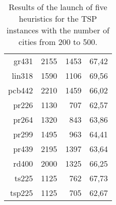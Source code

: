 \begin{table}[!htbp]
\begin{tabular}{||r|r|r|r||}
		gr431         & 2155                              & 1453                             & 67,42                                                \\
		lin318        & 1590                              & 1106                             & 69,56                                                \\
		pcb442        & 2210                              & 1459                             & 66,02                                                \\
		pr226         & 1130                              & 707                              & 62,57                                                \\
		pr264         & 1320                              & 843                              & 63,86                                                \\
		pr299         & 1495                              & 963                              & 64,41                                                \\
		pr439         & 2195                              & 1397                             & 63,64                                                \\
		rd400         & 2000                              & 1325                             & 66,25                                                \\
		ts225         & 1125                              & 762                              & 67,73                                                \\
		tsp225        & 1125                              & 705                              & 62,67												 \\ \bottomrule
	\end{tabular}
	\caption{Results of the launch of five heuristics for the TSP instances with the number of cities from 200 to 500.}
	\label{Tab:Heuristics_200_500}
\end{table}